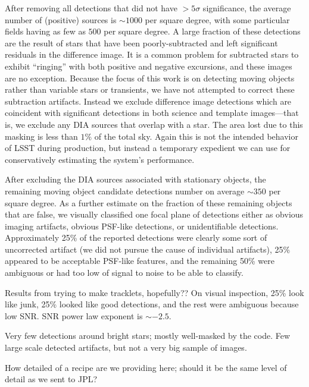 After removing all detections that did not have $>5\sigma$ significance, the
average number of (positive) sources is $\sim 1000$ per square degree, with some
particular fields having as few as $500$ per square degree. A large fraction of
these detections are the result of stars that have been poorly-subtracted and
left significant residuals in the difference image. It is a common problem for
subtracted stars to exhibit ``ringing'' with both positive and negative
excursions, and these images are no exception. Because the focus of this work
is on detecting moving objects rather than variable stars or transients, we have
not attempted to correct these subtraction artifacts. Instead we exclude
difference image detections which are coincident with significant detections in
both science and template images---that is, we exclude any DIA sources that
overlap with a star. The area lost due to this masking is less than $1\%$ of the
total sky. Again this is not the intended behavior of LSST during production,
but instead a temporary expedient we can use for conservatively estimating the
system's performance.

After excluding the DIA sources associated with stationary objects, the
remaining moving object candidate detections number on average $\sim 350$ per
square degree. As a further estimate on the fraction of these remaining objects
that are false, we visually classified one focal plane of detections either as
obvious imaging artifacts, obvious PSF-like detections, or unidentifiable
detections. Approximately 25\% of the reported detections were clearly some sort
of uncorrected artifact (we did not pursue the cause of individual artifacts),
25\% appeared to be acceptable PSF-like features, and the remaining 50\% were
ambiguous or had too low of signal to noise to be able to classify.


Results from trying to make tracklets, hopefully?? On visual inspection, 25\%
look like junk, 25\% looked like good detections, and the rest were ambiguous
because low SNR. SNR power law exponent is $\sim -2.5$.

Very few detections around bright stars; mostly well-masked by the code. Few
large scale detected artifacts, but not a very big sample of images.

How detailed of a recipe are we providing here; should it be the same level of
detail as we sent to JPL?
